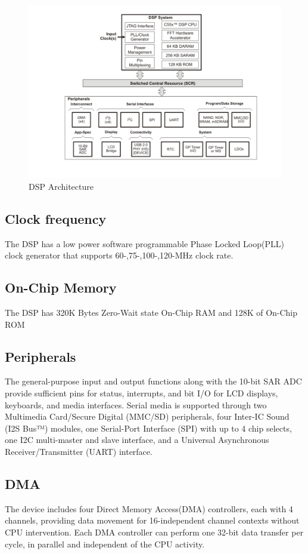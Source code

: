 \begin{figure}[h]
	\centering
	\includegraphics[scale = 0.75 ]{C5515 Architecture.PNG}
	\caption{DSP Architecture\label{C5515 Architecture}}
\end{figure} 
\subsection{Clock frequency}The DSP has a low power software programmable Phase Locked Loop(PLL) clock generator that  supports 60-,75-,100-,120-MHz clock rate.  
\subsection{On-Chip Memory}The DSP has 320K Bytes Zero-Wait state On-Chip RAM and 128K of On-Chip ROM

\subsection{Peripherals} The general-purpose input and output functions along with the 10-bit SAR ADC provide sufficient pins for status, interrupts, and bit I/O for LCD displays, keyboards, and media interfaces. Serial media is supported through two Multimedia Card/Secure Digital (MMC/SD) peripherals, four Inter-IC Sound (I2S Bus™) modules, one Serial-Port Interface (SPI) with up to 4 chip selects, one I2C multi-master and slave interface, and a Universal Asynchronous Receiver/Transmitter (UART) interface. 

\subsection{DMA} The device includes four Direct Memory Access(DMA) controllers, each with 4 channels, providing data movement for 16-independent channel contexts without CPU intervention. Each DMA controller can perform one 32-bit data transfer per cycle, in parallel and independent of the CPU activity.


